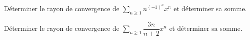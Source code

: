 \documentclass[a4paper,twoside,french,11pt]{VcCours}
\newcommand{\Sum}[2]{\sum_{#1}^{#2}}
\begin{document}
\begin{Exercice}{} Déterminer le rayon de convergence de $\Sum{n\geq 1}{}  n^{(-1)^n} x^n$ et déterminer sa somme.
\end{Exercice}


\begin{Exercice}{} Déterminer le rayon de convergence de $\Sum{n\geq 1}{} \dfrac{3n}{n+2} x^n$ et déterminer sa somme.
\end{Exercice}
\end{document}
